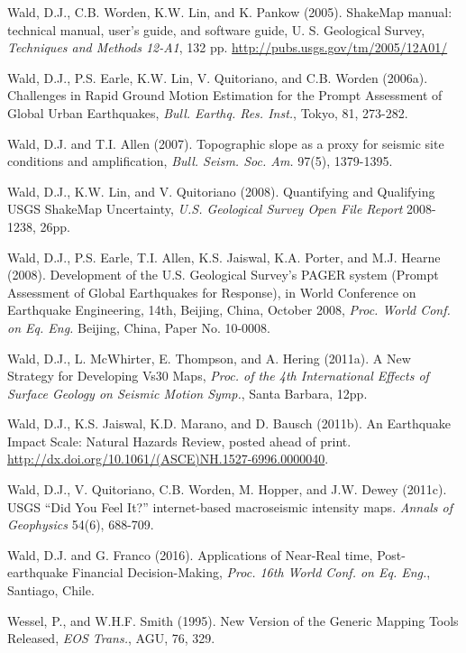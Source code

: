 \documentclass[letterpaper,10pt,english]{sphinxmanual}
\begin{document}
\label{references:wald2005}
Wald, D.J., C.B. Worden, K.W. Lin, and K. Pankow (2005). ShakeMap
manual: technical manual, user's guide, and software guide,
U. S. Geological Survey, \emph{Techniques and Methods 12-A1}, 132 pp.
\url{http://pubs.usgs.gov/tm/2005/12A01/}

Wald, D.J., P.S. Earle, K.W. Lin, V. Quitoriano, and C.B. Worden (2006a). Challenges in Rapid Ground
Motion Estimation for the Prompt Assessment of Global Urban Earthquakes, \emph{Bull. Earthq. Res. Inst.},
Tokyo, 81, 273-282.

\label{references:wald2007}
Wald, D.J. and T.I. Allen (2007). Topographic slope as a proxy for seismic site conditions and
amplification, \emph{Bull. Seism. Soc. Am.} 97(5), 1379-1395.

Wald, D.J., K.W. Lin, and V. Quitoriano (2008). Quantifying and Qualifying USGS ShakeMap
Uncertainty, \emph{U.S. Geological Survey Open File Report} 2008-1238, 26pp.

\label{references:wald2008}
Wald, D.J., P.S. Earle, T.I. Allen, K.S. Jaiswal, K.A. Porter, and M.J. Hearne (2008). Development of
the U.S. Geological Survey's PAGER system (Prompt Assessment of Global Earthquakes for
Response), in World Conference on Earthquake Engineering, 14th, Beijing, China, October 2008,
\emph{Proc. World Conf. on Eq. Eng.} Beijing, China, Paper No. 10-0008.

\label{references:wald2011a}
Wald, D.J., L. McWhirter, E. Thompson, and A. Hering (2011a). A New Strategy for Developing Vs30
Maps, \emph{Proc. of the 4th International Effects of Surface Geology on Seismic Motion Symp.}, Santa
Barbara, 12pp.

\label{references:wald2011b}
Wald, D.J., K.S. Jaiswal, K.D. Marano, and D. Bausch (2011b). An Earthquake Impact Scale: Natural
Hazards Review, posted ahead of print. \url{http://dx.doi.org/10.1061/(ASCE)NH.1527-6996.0000040}.

\label{references:wald2011c}
Wald, D.J., V. Quitoriano, C.B. Worden, M. Hopper, and J.W. Dewey (2011c). USGS ``Did You
Feel It?'' internet-based macroseismic intensity maps. \emph{Annals of Geophysics} 54(6), 688-709.

\label{references:wald2016}
Wald, D.J. and G. Franco (2016). Applications of Near-Real time,
Post-earthquake Financial Decision-Making, \emph{Proc. 16th World Conf. on Eq. Eng.}, Santiago, Chile.

\label{references:gmt-ref}
Wessel, P., and W.H.F. Smith (1995). New Version of the Generic Mapping Tools Released,
\emph{EOS Trans.}, AGU, 76, 329.
\end{document}
